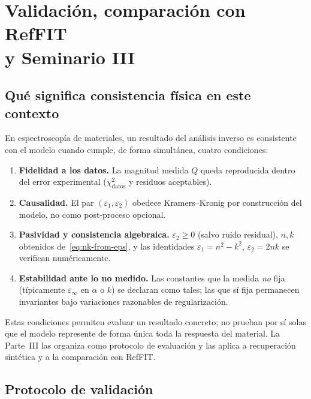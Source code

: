 \part{\texorpdfstring{Validaci\'on, comparaci\'on con RefFIT\\y Seminario III}{Validacion, comparacion con RefFIT y Seminario III}}

\chapter{Qu\'e significa consistencia f\'isica en este contexto}
\label{ch:verdad}

En espectroscop\'ia de materiales, un resultado del an\'alisis inverso es consistente con el modelo cuando cumple, de forma simult\'anea, cuatro condiciones:

\begin{enumerate}[leftmargin=*]
\item \textbf{Fidelidad a los datos.} La magnitud medida $Q$ queda reproducida dentro del error experimental ($\chi^{2}_{\mathrm{datos}}$ y residuos aceptables).
\item \textbf{Causalidad.} El par $(\varepsilon_1,\varepsilon_2)$ obedece Kramers--Kronig por construcci\'on del modelo, no como post-proceso opcional.
\item \textbf{Pasividad y consistencia algebraica.} $\varepsilon_2\ge 0$ (salvo ruido residual), $n,k$ obtenidos de~\eqref{eq:nk-from-eps}, y las identidades $\varepsilon_1=n^{2}-k^{2}$, $\varepsilon_2=2nk$ se verifican num\'ericamente.
\item \textbf{Estabilidad ante lo no medido.} Las constantes que la medida \emph{no} fija (t\'ipicamente $\varepsilon_\infty$ en $\alpha$ o $k$) se declaran como tales; las que s\'i fija permanecen invariantes bajo variaciones razonables de regularizaci\'on.
\end{enumerate}

Estas condiciones permiten evaluar un resultado concreto; no prueban por s\'i solas que el modelo represente de forma \'unica toda la respuesta del material. La Parte~III las organiza como protocolo de evaluaci\'on y las aplica a recuperaci\'on sint\'etica y a la comparaci\'on con RefFIT.


\chapter{Protocolo de validaci\'on}
\label{ch:protocolo}

